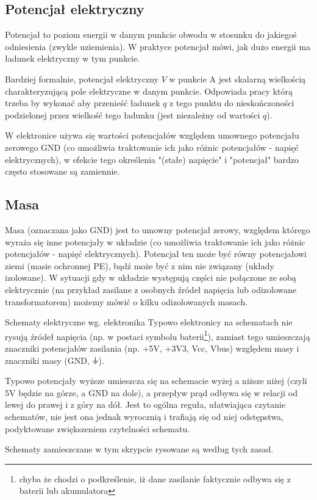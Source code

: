 \subsection{Potencjał elektryczny}

Potencjał to poziom energii w danym punkcie obwodu w stosunku do jakiegoś odniesienia (zwykle uziemienia). W praktyce potencjał mówi, jak dużo energii ma ładunek elektryczny w tym punkcie.

Bardziej formalnie, potencjał elektryczny $V$ w punkcie A
jest skalarną wielkością charakteryzującą pole elektryczne w danym punkcie. Odpowiada pracy którą trzeba by wykonać aby przenieść ładunek $q$ z tego punktu do nieskończoności podzielonej przez wielkość tego ładunku (jest niezależny od wartości $q$).

W elektronice używa się wartości potencjałów względem umownego potencjału zerowego GND (co umożliwia traktowanie ich jako różnic potencjałów - napięć elektrycznych), w efekcie tego określenia "(stałe) napięcie" i "potencjał" bardzo często stosowane są zamiennie.

\subsection{Masa}

Masa (oznaczana jako GND) jest to
umowny potencjał zerowy, względem którego wyraża się inne potencjały w układzie (co umożliwia traktowanie ich jako różnic potencjałów - napięć elektrycznych). Potencjał ten może być równy potencjałowi ziemi (masie ochronnej PE), bądź może być z nim nie związany (układy izolowane).
W sytuacji gdy w układzie występują części nie połączone ze sobą elektrycznie (na przykład zasilane z osobnych źródeł napięcia lub odizolowane transformatorem) możemy mówić o kilku odizolowanych masach.

\begin{ProTip}{Schematy elektryczne wg. elektronika}
Typowo elektronicy na schematach nie rysują źródeł napięcia (np. w postaci symbolu baterii\footnote{chyba że chodzi o podkreślenie, iż dane zasilanie faktycznie odbywa się z baterii lub akumulatora}),
zamiast tego umieszczają znaczniki potencjałów zasilania (np. +5V, +3V3, Vcc, Vbus) względem masy i znaczniki masy (GND, {\Symbola ⏚}).

\vspace{3pt}Typowo potencjały wyższe umieszcza się na schemacie wyżej a niższe niżej (czyli 5V będzie na górze, a GND na dole), a przepływ prąd odbywa się w relacji od lewej do prawej i z góry na dół.
Jest to ogólna reguła, ułatwiająca czytanie schematów, nie jest ona jednak wyrocznią i trafiają się od niej odstępstwa, podyktowane zwiększeniem czytelności schematu.

\vspace{3pt}Schematy zamieszczane w tym skrypcie rysowane są według tych zasad.
\end{ProTip}

